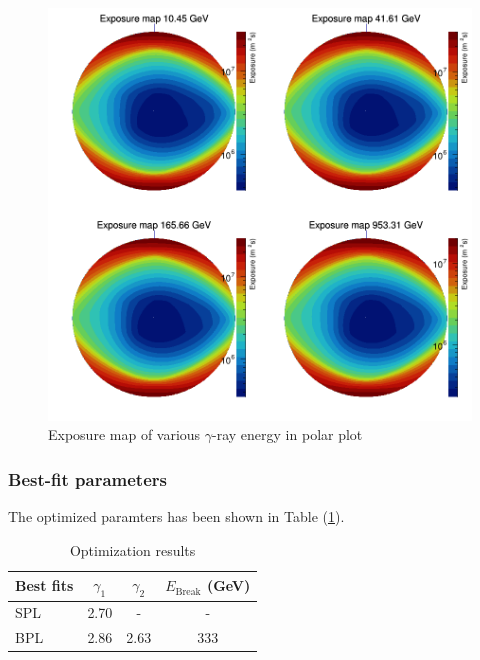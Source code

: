 \begin{figure}[h!]
    \centering
    \includegraphics[width=\textwidth]{img/polar_expmaps}
    \caption{Exposure map of various $\gamma$-ray energy in polar plot}
    \label{fig:expmapspolar}
\end{figure}



\subsubsection*{Best-fit parameters}
The optimized paramters has been shown in Table (\ref{tb:bestfit}).

\begin{table}
    \centering
    \begin{tabular}{l | c | c | c}
      Best fits & $\gamma_1$ & $\gamma_2$ & $E_{\text{Break}}$ (GeV) \\
      \hline \hline
      SPL & 2.70 & - & -  \\
      BPL & 2.86  & 2.63 & 333
    \end{tabular}
    \caption{Optimization results}
    \label{tb:bestfit}
\end{table}

